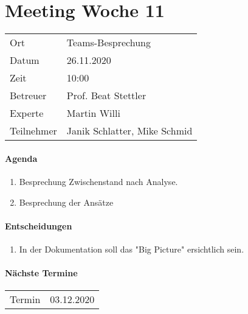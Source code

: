 \section*{Meeting Woche 11}

\begin{table}[h!]
	\begin{tabularx}{\textwidth}{l X }
		Ort & Teams-Besprechung \\
		Datum & 26.11.2020 \\
		Zeit & 10:00 \\
        Betreuer & Prof. Beat Stettler\\
        Experte & Martin Willi \\
		Teilnehmer & Janik Schlatter, Mike Schmid \\
	\end{tabularx}
\end{table}

\paragraph{Agenda}
\begin{enumerate}
	\item Besprechung Zwischenstand nach Analyse.
	\item Besprechung der Ansätze
\end{enumerate}

\paragraph{Entscheidungen}
\begin{enumerate}
	\item In der Dokumentation soll das "Big Picture" ersichtlich sein.
\end{enumerate}

\paragraph{Nächste Termine} \hfill
\begin{table}[h!]
	\begin{tabularx}{\textwidth}{l X }
		Termin & 03.12.2020 \\
	\end{tabularx}
\end{table}

\clearpage